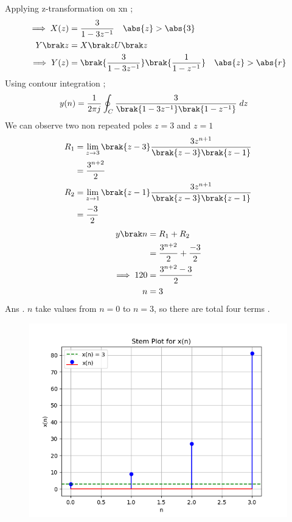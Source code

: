 \documentclass[journal,12pt,twocolumn]{IEEEtran}
\theoremstyle{remark}
\begin{document}
Applying z-transformation on x\brak n ;
\begin{align}
\implies X(z) &=\frac{3}{1-3z^{-1}} \quad \abs{z} > \abs{3}\\
Y \brak z &= X\brak zU\brak z\\
\implies Y(z)&=\brak{\frac{3}{1-3 z^{-1}}}\brak{\frac{1}{1- z^{-1}}}  \quad \abs{z} > \abs{r}
\end{align}
Using contour integration  ;
\begin{align}
   y(n) &=\frac{1}{2\pi j}\oint_{C}{\frac{3}{\brak{1-3 z^{-1}}\brak{1- z^{-1}}}}  \;dz 
\end{align}
We can observe two non repeated poles $z=3$ and $z=1$
\begin{align}
    R_1&=\lim\limits_{z\to 3} \brak{z-3} \frac{3 z^{n+1}}{\brak{z-3}\brak{z-1}}\\
  &=\frac{3^{n+2}}{2}\\
   R_2&=\lim\limits_{z\to 1} \brak{z-1} \frac{3 z^{n+1}}{\brak{z-3}\brak{z-1}}\\
  &=\frac{-3}{2}
      \end{align}
      \begin{align}
  y\brak n&= R_1+R_2\\
   &=\frac{3^{n+2}}{2}+\frac{-3}{2} \\
  \implies 120&=\frac{3^{n+2}-3}{2} \\
    n&=3
\end{align}
Ans . $n$ take values from $n=0$ to  $n=3$, so there are total four terms .
\newpage
\begin{figure}
   \includegraphics[width=1\linewidth]{figs/i1.png}
\end{figure}
\end{document}
